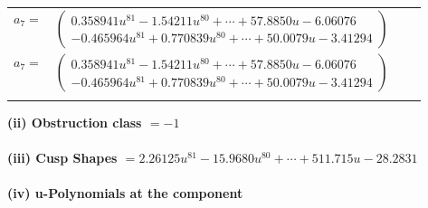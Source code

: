 \documentclass[1p]{elsarticle_modified}
\theoremstyle{definition}
\begin{document}
\begin{tabular}{m{7pt} m{180pt} m{7pt} m{180pt} }
\flushright $a_{7}=$&$\begin{pmatrix}0.358941 u^{81}-1.54211 u^{80}+\cdots+57.8850 u-6.06076\\-0.465964 u^{81}+0.770839 u^{80}+\cdots+50.0079 u-3.41294\end{pmatrix}$\\ \flushright $a_{7}=$&$\begin{pmatrix}0.358941 u^{81}-1.54211 u^{80}+\cdots+57.8850 u-6.06076\\-0.465964 u^{81}+0.770839 u^{80}+\cdots+50.0079 u-3.41294\end{pmatrix}$\\&\end{tabular}
\flushleft \textbf{(ii) Obstruction class $= -1$}\\~\\
\flushleft \textbf{(iii) Cusp Shapes $= 2.26125 u^{81}-15.9680 u^{80}+\cdots+511.715 u-28.2831$}\\~\\
\newpage\renewcommand{\arraystretch}{1}
\flushleft \textbf{(iv) u-Polynomials at the component}\newline \\
\end{document}
